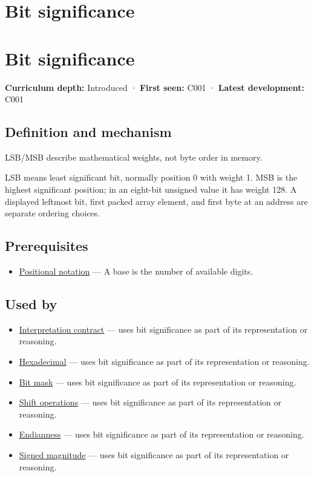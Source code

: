 \hypertarget{appendix-280445746493}{}
\section*{Bit significance}
\section{Bit significance}\label{bit-significance}

\textbf{Curriculum depth:} Introduced · \textbf{First seen:} C001 · \textbf{Latest development:} C001

\subsection{Definition and mechanism}\label{definition-and-mechanism}

LSB/MSB describe mathematical weights, not byte order in memory.

LSB means least significant bit, normally position 0 with weight 1. MSB is the highest significant position; in an eight-bit unsigned value it has weight 128. A displayed leftmost bit, first packed array element, and first byte at an address are separate ordering choices.

\subsection{Prerequisites}\label{prerequisites}

\begin{itemize}
\tightlist
\item
  \hyperref[appendix-83c3f28f7bda]{Positional notation} --- A base is the number of available digits.
\end{itemize}

\subsection{Used by}\label{used-by}

\begin{itemize}
\tightlist
\item
  \hyperref[appendix-f414bd4ed05c]{Interpretation contract} --- uses bit significance as part of its representation or reasoning.
\item
  \hyperref[appendix-6b8075763724]{Hexadecimal} --- uses bit significance as part of its representation or reasoning.
\item
  \hyperref[appendix-dbe5905163c2]{Bit mask} --- uses bit significance as part of its representation or reasoning.
\item
  \hyperref[appendix-73425b25118e]{Shift operations} --- uses bit significance as part of its representation or reasoning.
\item
  \hyperref[appendix-bc07c3d25b18]{Endianness} --- uses bit significance as part of its representation or reasoning.
\item
  \hyperref[appendix-ce20506c8532]{Signed magnitude} --- uses bit significance as part of its representation or reasoning.
\end{itemize}

